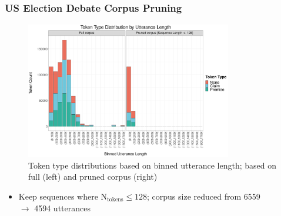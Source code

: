 \documentclass{beamer}
\begin{document}
\subsection{}
\begin{framefont}{\footnotesize}
	\begin{frame}
		\frametitle{US Election Debate Corpus Pruning}
			\begin{figure}				       
			\captionsetup{justification=centering}
		   	\includegraphics[trim={0cm 0cm 0cm 0cm},clip,width=9cm]{global_length_trunc.pdf}
		   	\caption{Token type distributions based on binned utterance length; based on full (left) and pruned corpus (right)}
			\end{figure}
		\vspace{-3pt}
		\begin{itemize}
			\setlength\itemsep{0.8em}
			\item Keep sequences where N$_{\text{tokens}} \leq 128$; corpus size reduced from 6559\\ $\longrightarrow$ 4594 utterances
		\end{itemize}
	\end{frame}
\end{framefont}
\end{document}

